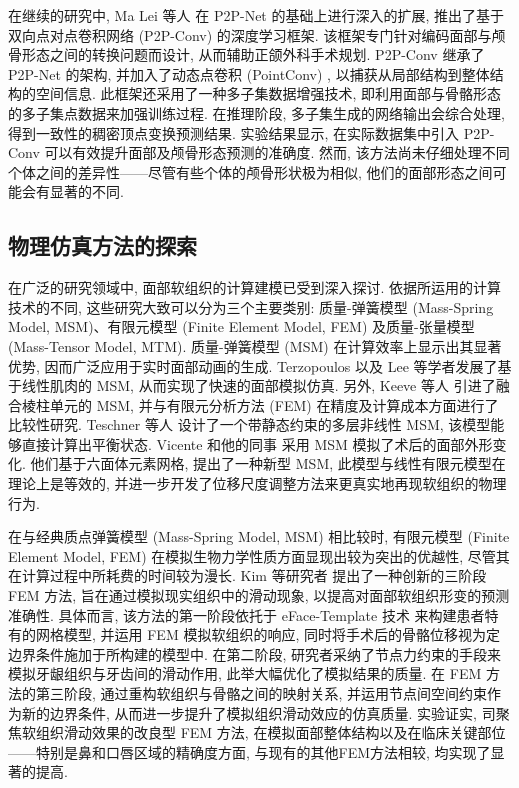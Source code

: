 在继续的研究中, Ma Lei 等人 \cite{maBidirectionalPredictionFacial2023} 在 P2P-Net \cite{yinP2PNETBidirectionalPoint2018} 的基础上进行深入的扩展, 推出了基于双向点对点卷积网络 (P2P-Conv) 的深度学习框架.
该框架专门针对编码面部与颅骨形态之间的转换问题而设计, 从而辅助正颌外科手术规划.
P2P-Conv 继承了 P2P-Net 的架构, 并加入了动态点卷积 (PointConv) , 以捕获从局部结构到整体结构的空间信息.
此框架还采用了一种多子集数据增强技术, 即利用面部与骨骼形态的多子集点数据来加强训练过程.
在推理阶段, 多子集生成的网络输出会综合处理, 得到一致性的稠密顶点变换预测结果.
实验结果显示, 在实际数据集中引入 P2P-Conv 可以有效提升面部及颅骨形态预测的准确度.
然而, 该方法尚未仔细处理不同个体之间的差异性——尽管有些个体的颅骨形状极为相似, 他们的面部形态之间可能会有显著的不同.

\subsection{物理仿真方法的探索}

在广泛的研究领域中, 面部软组织的计算建模已受到深入探讨.
依据所运用的计算技术的不同, 这些研究大致可以分为三个主要类别: 质量-弹簧模型 (Mass-Spring Model, MSM)、有限元模型 (Finite Element Model, FEM) 及质量-张量模型 (Mass-Tensor Model, MTM).
质量-弹簧模型 (MSM) 在计算效率上显示出其显著优势, 因而广泛应用于实时面部动画的生成.
Terzopoulos \cite{terzopoulosPhysicallyBasedFacial1990} 以及 Lee \cite{leeRealisticModelingFacial1995} 等学者发展了基于线性肌肉的 MSM, 从而实现了快速的面部模拟仿真.
另外, Keeve 等人 \cite{keeveDeformableModelingFacial1998} 引进了融合棱柱单元的 MSM, 并与有限元分析方法 (FEM) 在精度及计算成本方面进行了比较性研究.
Teschner 等人 \cite{teschnerDirectComputationNonlinear} 设计了一个带静态约束的多层非线性 MSM, 该模型能够直接计算出平衡状态.
Vicente 和他的同事 \cite{vicenteMaxillofacialSurgerySimulation2009} 采用 MSM 模拟了术后的面部外形变化.
他们基于六面体元素网格, 提出了一种新型 MSM, 此模型与线性有限元模型在理论上是等效的, 并进一步开发了位移尺度调整方法来更真实地再现软组织的物理行为.

在与经典质点弹簧模型 (Mass-Spring Model, MSM) 相比较时, 有限元模型 (Finite Element Model, FEM) 在模拟生物力学性质方面显现出较为突出的优越性, 尽管其在计算过程中所耗费的时间较为漫长.
Kim 等研究者 \cite{kimClinicallyValidatedPrediction2017} 提出了一种创新的三阶段 FEM 方法, 旨在通过模拟现实组织中的滑动现象, 以提高对面部软组织形变的预测准确性.
具体而言, 该方法的第一阶段依托于 eFace-Template 技术 \cite{zhangEFacetemplateMethodEfficiently2016} 来构建患者特有的网格模型, 并运用 FEM 模拟软组织的响应, 同时将手术后的骨骼位移视为定边界条件施加于所构建的模型中.
在第二阶段, 研究者采纳了节点力约束的手段来模拟牙龈组织与牙齿间的滑动作用, 此举大幅优化了模拟结果的质量.
在 FEM 方法的第三阶段, 通过重构软组织与骨骼之间的映射关系, 并运用节点间空间约束作为新的边界条件, 从而进一步提升了模拟组织滑动效应的仿真质量.
实验证实, 司聚焦软组织滑动效果的改良型 FEM 方法, 在模拟面部整体结构以及在临床关键部位——特别是鼻和口唇区域的精确度方面, 与现有的其他FEM方法相较, 均实现了显著的提高.

